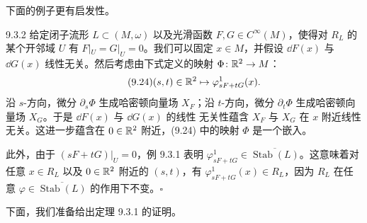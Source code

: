 下面的例子更有启发性。

\begin{wexam}{9.3.2}
  给定闭子流形 $L\subset(M,\omega)$ 以及光滑函数 $F,G\in C^\infty(M)$，使得对
  $R_L$ 的某个开邻域 $U$ 有 $F|_U=G|_U=0$。我们可以固定 $x\in M$，并假设
  $\dd F(x)$ 与 $\dd G(x)$ 线性无关。然后考虑由下式定义的映射
  $\Phi\colon\mathbb{R}^2\to M$：
  \begin{equation}\tag{9.24}
    (s,t)\in\mathbb{R}^2\mapsto\varphi_{sF+tG}^1(x).
  \end{equation}
  沿 $s$-方向，微分 $\partial_s\Phi$ 生成哈密顿向量场 $X_F$；沿 $t$-方向，微分
  $\partial_t\Phi$ 生成哈密顿向量场 $X_G$。于是 $\dd F(x)$ 与 $\dd G(x)$ 的线性
  无关性蕴含 $X_F$ 与 $X_G$ 在 $x$ 附近线性无关。这进一步蕴含在
  $0\in\mathbb{R}^2$ 附近，(9.24) 中的映射 $\Phi$ 是一个嵌入。

  此外，由于 $(sF+tG)|_U=0$，例 9.3.1 表明
  $\varphi_{sF+tG}^1\in\overline{\operatorname{Stab}(L)}$。这意味着对任意
  $x\in R_L$ 以及 $0\in\mathbb{R}^2$ 附近的 $(s,t)$，有
  $\varphi_{sF+tG}^1(x)\in R_L$，因为 $R_L$ 在任意
  $\varphi\in\overline{\operatorname{Stab}(L)}$ 的作用下不变。\hfill$\square$
\end{wexam}

下面，我们准备给出定理 9.3.1 的证明。

